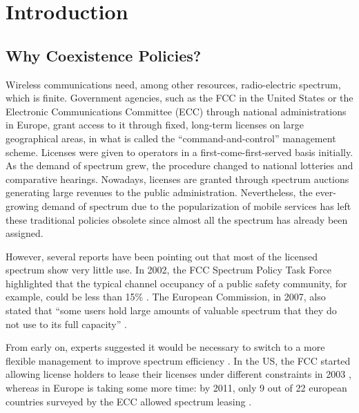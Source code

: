 \graphicspath{ {img/SPEC_MAN/} }
\chapter{Introduction}
\section{Why Coexistence Policies?}
Wireless communications need, among other resources, radio-electric spectrum, which is finite. 
Government agencies, such as the FCC in the United States or the Electronic Communications Committee (ECC) through national administrations in Europe, grant access to it through fixed, long-term licenses on large geographical areas, in what is called the \enquote{command-and-control} management scheme. 
Licenses were given to operators in a first-come-first-served basis initially. As the demand of spectrum grew, the procedure changed to national lotteries and comparative hearings. Nowadays, licenses are granted through spectrum auctions generating large revenues to the public administration. %
Nevertheless, the ever-growing demand of spectrum due to the popularization of mobile services has left these traditional policies obsolete since almost all the spectrum has already been assigned. %

However, several reports have been pointing out that most of the licensed spectrum show very little use. In 2002, the FCC Spectrum Policy Task Force highlighted that the typical channel occupancy of a public safety community, for example, could be less than 15\% \cite{ref:FCC2002}. The European Commission, in 2007, also stated that \enquote{some users hold large amounts of valuable spectrum that they do not use to its full capacity} \cite{ref:Commission2007}.

From early on, experts suggested it would be necessary to switch to a more flexible management to improve spectrum efficiency \cite{ref:Valletti2001}. In the US, the FCC started allowing license holders to lease their licenses under different constraints in 2003 \cite{ref:Mayo2010}, whereas in Europe is taking some more time: by 2011, only 9 out of 22 european countries surveyed by the ECC allowed spectrum leasing \cite{ref:ECC2011}. %

